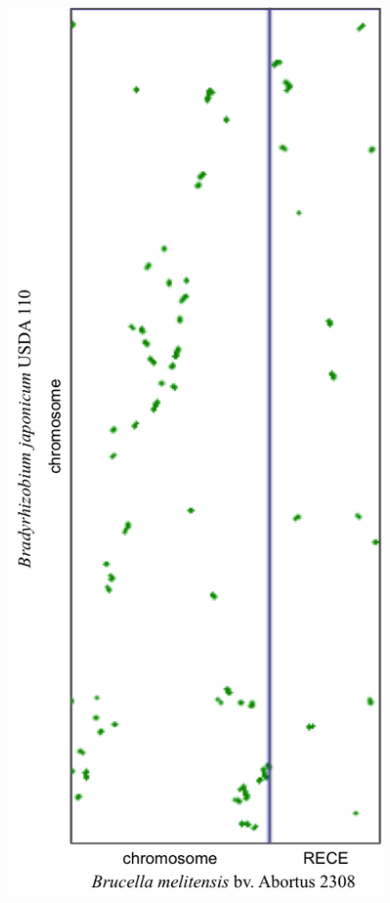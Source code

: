    
\begin{figure}[H]
\begin{center}
\hspace*{-3cm}
	\begin{minipage}{0.5\textwidth}
		\includegraphics[width=\textwidth]{./img/synteny/new/fig8_8d.png}

\end{minipage}
\end{center}
\end{figure}
